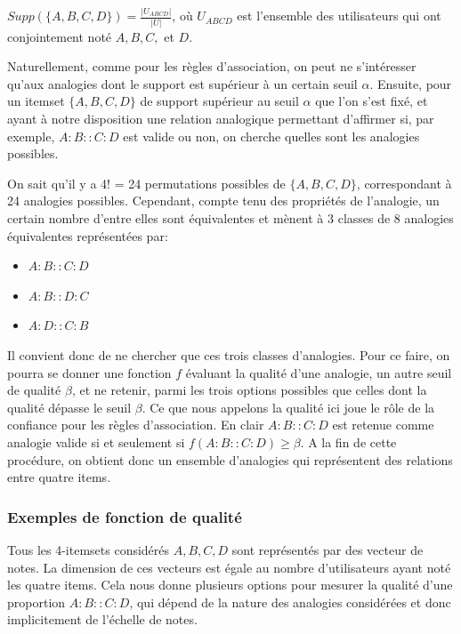 $Supp(\{A, B, C, D \})= \frac{|U_{ABCD}|}{|U|}$, où $U_{ABCD}$ est l'ensemble
des utilisateurs qui ont conjointement noté $A, B, C,$ et $D$.

Naturellement, comme pour les règles d'association, on peut ne
s'intéresser qu'aux analogies dont le support est supérieur à un certain
seuil $\alpha$.  Ensuite, pour un itemset $\{A, B, C, D \}$ de support
supérieur au seuil $\alpha$ que l'on s'est fixé, et ayant à notre
disposition une relation analogique permettant d'affirmer si, par exemple,
$A:B::C:D$ est valide ou non, on cherche quelles sont les analogies possibles.

On sait qu'il y a 4! = 24 permutations possibles de $\{A, B, C, D \}$,
correspondant à 24 analogies possibles. Cependant, compte tenu des
propriétés de l'analogie, un certain nombre d'entre elles sont
équivalentes et mènent à 3 classes de 8 analogies équivalentes
représentées par:
\begin{itemize}
\item $A:B::C:D$
\item $A:B::D:C$
\item $A:D::C:B$
\end{itemize}
Il convient donc de ne chercher que ces trois classes d'analogies.  Pour ce
faire, on pourra se donner une fonction $f$ évaluant la qualité d'une
analogie, un autre seuil de qualité $\beta$, et ne retenir, parmi les trois
options possibles que celles dont la qualité dépasse le seuil $\beta$. Ce que
nous appelons la qualité ici joue le rôle de la confiance pour les règles
d'association.  En clair $A:B::C:D$ est retenue comme analogie  valide si et
seulement si $f(A:B::C:D) \geq \beta$.  A la fin de cette procédure, on obtient
donc un ensemble d'analogies qui représentent des relations entre quatre items.

\subsubsection{Exemples de fonction de qualité}
Tous les 4-itemsets considérés $A, B, C, D$ sont représentés par
des vecteur de notes.  La dimension de ces vecteurs est égale au nombre
d'utilisateurs ayant noté les quatre items.  Cela nous donne plusieurs options
pour mesurer la qualité d'une proportion $A:B::C:D$, qui dépend de la nature
des analogies considérées et donc implicitement de l'échelle de notes.

